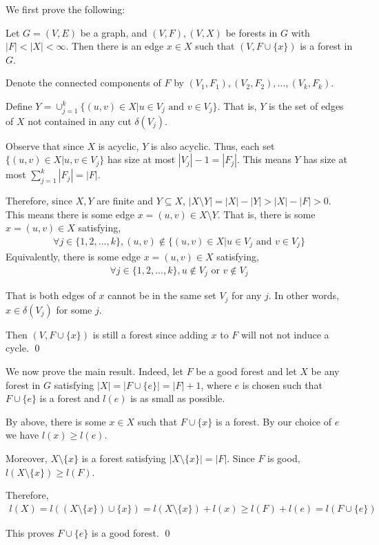 \documentclass[10pt]{article}
\begin{document}
\begin{solution}[Solution]
We first prove the following:

Let \( G=(V,E) \) be a graph, and \( (V,F),(V,X) \) be forests in \( G \) with \( |F| < |X| < \infty \). Then there is an edge \( x\in X \) such that \( (V,F\cup\{x\}) \) is a forest in \( G \).


Denote the connected components of \( F \) by \( (V_1,F_1), (V_2,F_2), ..., (V_k,F_k) \). 

Define \( Y = \cup_{j=1}^{k}\{ (u,v)\in X | u\in V_j \text{ and } v\in V_j \} \). That is, \( Y \) is the set of edges of \( X \) not contained in any cut \( \delta(V_j) \).

Observe that since \( X \) is acyclic, \( Y \) is also acyclic. Thus, each set \( \{(u,v)\in X | u,v\in V_j\} \) has size at most \( |V_j|-1 = |F_j| \). This means \( Y \) has size at most \( \sum_{j=1}^{k}|F_j| = |F| \).

Therefore, since \( X,Y \) are finite and \( Y\subseteq X \), \( |X\setminus Y| = |X| - |Y| > |X|-|F| > 0 \). This means there is some edge \( x=(u,v)\in X\setminus Y \). That is, there is some \( x=(u,v)\in X \) satisfying,
\begin{align*}
    \forall j\in\{1,2,...,k\}, (u,v)\notin \{(u,v)\in X|u\in V_j \text{ and }v\in V_j\} 
\end{align*}
Equivalently, there is some edge \( x=(u,v)\in X \) satisfying,
\begin{align*}
    \forall j\in\{1,2,...,k\}, u\not\in V_j \text{ or } v\notin V_j
\end{align*}

That is both edges of \( x \) cannot be in the same set \( V_j \) for any \( j \). In other words, \( x\in\delta(V_j) \) for some \( j \).


Then \( (V,F\cup\{x\}) \) is still a forest since adding \( x \) to \( F \) will not not induce a cycle. \qed


We now prove the main result. Indeed, let \( F \) be a good forest and let \( X \) be any forest in \( G \) satisfying \( |X| = |F\cup\{e\}| = |F|+1 \), where \( e \) is chosen such that \( F\cup\{e\} \) is a forest and \( l(e) \) is as small as possible.

By above, there is some \( x\in X \) such that \( F\cup\{x\} \) is a forest. By our choice of \( e \) we have \( l(x)\geq l(e) \).

Moreover, \( X\setminus\{x\} \) is a forest satisfying \( |X\setminus\{x\}| = |F| \). Since \( F \) is good, \( l(X\setminus\{x\}) \geq l(F) \).

Therefore,
\begin{align*}
    l(X) = l((X\setminus\{x\})\cup\{x\}) = l(X\setminus\{x\}) + l(x) \geq l(F)+l(e) = l(F\cup\{e\}) 
\end{align*}

This proves \( F\cup\{e\} \) is a good forest. \qed
\end{solution}
\end{document}
